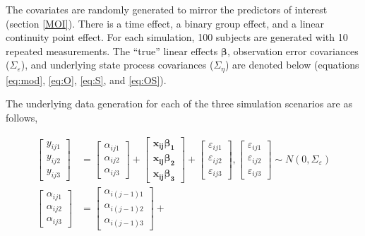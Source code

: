 \documentclass[
]{article}
\begin{document}
The covariates are randomly generated to mirror the predictors of interest (section \ref{MOI}). There is a time effect, a binary group effect, and a linear continuity point effect. For each simulation, 100 subjects are generated with 10 repeated measurements. The ``true'' linear effects \(\boldsymbol{\beta}\), observation error covariances (\(\Sigma_\varepsilon\)), and underlying state process covariances (\(\Sigma_\eta\)) are denoted below (equations \ref{eq:mod}, \ref{eq:O}, \ref{eq:S}, and \ref{eq:OS}).

The underlying data generation for each of the three simulation scenarios are as follows,

\begin{equation}\label{eq:mod}
\begin{aligned}
\begin{bmatrix}
y_{ij1}\\
y_{ij2}\\
y_{ij3}
\end{bmatrix}
&= \begin{bmatrix}
\alpha_{ij1}\\
\alpha_{ij2}\\
\alpha_{ij3}
\end{bmatrix}
+ 
\begin{bmatrix}
\boldsymbol{x_{ij}\beta_1}\\
\boldsymbol{x_{ij}\beta_2}\\
\boldsymbol{x_{ij}\beta_3} 
\end{bmatrix} +
\begin{bmatrix}
\varepsilon_{ij1}\\
\varepsilon_{ij2}\\
\varepsilon_{ij3}
\end{bmatrix},  
\begin{bmatrix}
\varepsilon_{ij1}\\
\varepsilon_{ij2}\\
\varepsilon_{ij3}
\end{bmatrix} 
\sim N(0, \Sigma_\varepsilon
)\\
\begin{bmatrix}
\alpha_{ij1}\\
\alpha_{ij2}\\
\alpha_{ij3}
\end{bmatrix} & = 
\begin{bmatrix}
\alpha_{i(j-1)1}\\
\alpha_{i(j-1)2}\\
\alpha_{i(j-1)3}
\end{bmatrix} +

\end{aligned}
\end{equation}
\end{document}
